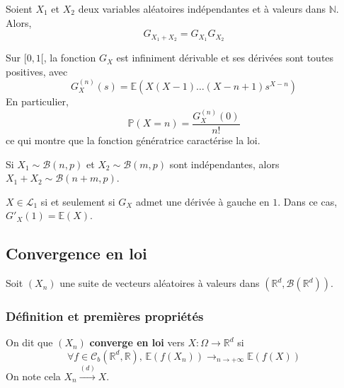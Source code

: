   \begin{proposition}
    Soient $X_1$ et $X_2$ deux variables aléatoires indépendantes et à valeurs dans $\mathbb{N}$. Alors,
    \[ G_{X_1+X_2} = G_{X_1}G_{X_2} \]
  \end{proposition}

  \begin{theorem}
    Sur $[0,1[$, la fonction $G_X$ est infiniment dérivable et ses dérivées sont toutes positives, avec
    \[ G_X^{(n)}(s) = \mathbb{E}(X(X-1) \dots (X-n+1)s^{X-n}) \]
    En particulier,
    \[ \mathbb{P}(X=n) = \frac{G_X^{(n)}(0)}{n!} \]
    ce qui montre que la fonction génératrice caractérise la loi.
  \end{theorem}


  \begin{example}
    Si $X_1 \sim \mathcal{B}(n, p)$ et $X_2 \sim \mathcal{B}(m, p)$ sont indépendantes, alors $X_1 + X_2 \sim \mathcal{B}(n + m, p)$.
  \end{example}


  \begin{theorem}
    $X \in \mathcal{L}_1$ si et seulement si $G_X$ admet une dérivée à gauche en $1$. Dans ce cas, $G'_X(1) = \mathbb{E}(X)$.
  \end{theorem}

  \subsection{Convergence en loi}

  Soit $(X_n)$ une suite de vecteurs aléatoires à valeurs dans $(\mathbb{R}^d, \mathcal{B}(\mathbb{R}^d))$.

  \subsubsection{Définition et premières propriétés}


  \begin{definition}
    On dit que $(X_n)$ \textbf{converge en loi} vers $X : \Omega \rightarrow \mathbb{R}^d$ si
    \[ \forall f \in \mathcal{C}_b(\mathbb{R}^d, \mathbb{R}), \, \mathbb{E}(f(X_n)) \longrightarrow_{n \rightarrow +\infty} \mathbb{E}(f(X)) \]
    On note cela $X_n \overset{(d)}{\longrightarrow} X$.
  \end{definition}

